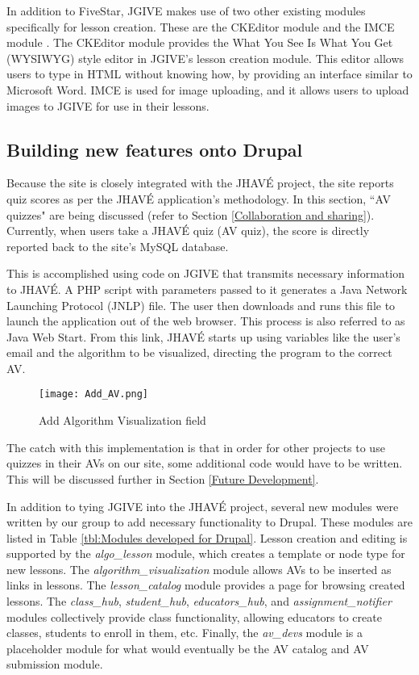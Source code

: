 \documentclass{acm_proc_article-sp}
\begin{document}
In addition to FiveStar, JGIVE makes use of two other existing modules specifically for lesson creation. These are the CKEditor module and the IMCE module \cite{drupal}. The CKEditor module provides the What You See Is What You Get (WYSIWYG) style editor in JGIVE's lesson creation module. This editor allows users to type in HTML without knowing how, by providing an interface similar to Microsoft Word. IMCE is used for image uploading, and it allows users to upload images to JGIVE for use in their lessons.

\subsection{Building new features onto Drupal}
Because the site is closely integrated with the JHAV\'{E} project, the site reports quiz scores as per the JHAV\'{E} application's methodology. In this section, ``AV quizzes" are being discussed (refer to Section \ref{Collaboration and sharing}). Currently, when users take a JHAV\'{E} quiz (AV quiz), the score is directly reported back to the site's MySQL database.

This is accomplished using code on JGIVE that transmits necessary information to JHAV\'{E}. A PHP script with parameters passed to it generates a Java Network Launching Protocol (JNLP) file. The user then downloads and runs this file to launch the application out of the web browser. This process is also referred to as Java Web Start. From this link, JHAV\'{E} starts up using variables like the user's email and the algorithm to be visualized, directing the program to the correct AV.

\begin{figure}[h]
  \begin{center}
    \texttt{[image: Add\_AV.png]}
  \end{center}
  \caption{Add Algorithm Visualization field}
\end{figure}

The catch with this implementation is that in order for other projects to use quizzes in their AVs on our site, some additional code would have to be written. This will be discussed further in Section \ref{Future Development}.

In addition to tying JGIVE into the JHAV\'{E} project, several new modules were written by our group to add necessary functionality to Drupal. These modules are listed in Table \ref{tbl:Modules developed for Drupal}. Lesson creation and editing is supported by the \emph{algo\_lesson} module, which creates a template or node type for new lessons. The \emph{algorithm\_visualization} module allows AVs to be inserted as links in lessons. The \emph{lesson\_catalog} module provides a page for browsing created lessons. The \emph{class\_hub}, \emph{student\_hub}, \emph{educators\_hub}, and \emph{assignment\_notifier} modules collectively provide class functionality, allowing educators to create classes, students to enroll in them, etc. Finally, the \emph{av\_devs} module is a placeholder module for what would eventually be the AV catalog and AV submission module.
\end{document}
